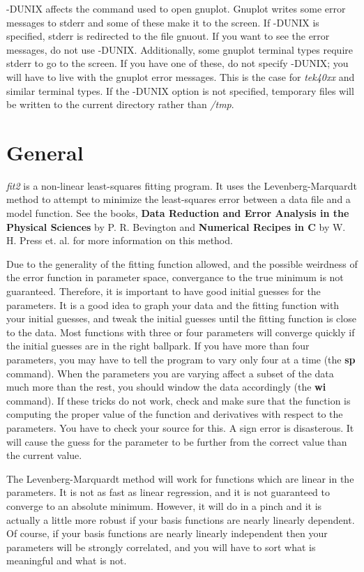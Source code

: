  -DUNIX affects the command used to open gnuplot.  Gnuplot
 writes some error messages to stderr and some of these 
 make it to the screen.  If -DUNIX is specified, stderr is 
 redirected to the file gnuout.  If you want to see the 
 error messages, do not use -DUNIX.  Additionally, some 
 gnuplot terminal types require stderr to go to the screen.
 If you have one of these, do not specify -DUNIX; you will 
 have to live with the gnuplot error messages.  This is the
 case for {\em tek40xx} and similar terminal types.  If the -DUNIX option is not
 specified, temporary files will be written to the current 
 directory rather than {\em /tmp}.

\section{General}

 {\em fit2} is a non-linear least-squares fitting program. It uses
 the Levenberg-Marquardt method to attempt to minimize the 
 least-squares error between a data file and a model 
 function.  See the books, {\bf Data Reduction and Error Analysis
 in the Physical Sciences} by P. R. Bevington and {\bf Numerical 
 Recipes in C} by W. H. Press et. al. for more information 
 on this method.

 Due to the generality of the fitting function allowed,
 and the possible weirdness of the error function in
 parameter space, convergance to the true minimum is not
 guaranteed.  Therefore, it is important to have good
 initial guesses for the parameters.  It is a good idea to 
 graph your data and the fitting function with your
 initial guesses, and tweak the initial guesses until the 
 fitting function is close to the data.  Most functions
 with three or four parameters will converge quickly if the
 initial guesses are in the right ballpark.  If you have 
 more than four parameters, you may have to tell the program
 to vary only four at a time (the {\bf sp} command).  When the 
 parameters you are varying affect a subset of the data 
 much more than the rest, you should window the data 
 accordingly (the {\bf wi} command). If these tricks do not work, 
 check and make sure that the function is computing the 
 proper value of the function and derivatives with respect 
 to the parameters.  You have to check your source for this. 
 A sign error is disasterous.  It will cause the guess for 
 the parameter to be further from the correct value than 
 the current value.

 The Levenberg-Marquardt method will work for functions
 which are linear in the parameters.  It is not as fast as 
 linear regression, and it is not guaranteed to converge to
 an absolute minimum.  However, it will do in a pinch and
 it is actually a little more robust if your basis functions 
 are nearly linearly dependent.  Of course, if your basis 
 functions are nearly linearly independent then your 
 parameters will be strongly correlated, and you will have 
 to sort what is meaningful and what is not.

